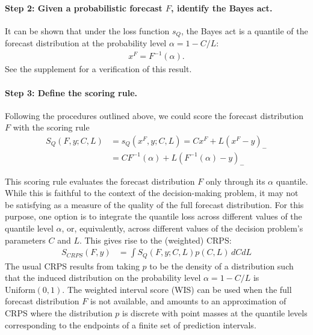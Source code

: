 \documentclass{article}
\begin{document}
\paragraph{Step 2: Given a probabilistic forecast $F$, identify the Bayes act.} It can be shown that under the loss function $s_Q$, the Bayes act is a quantile of the forecast distribution at the probability level $\alpha = 1 - C/L$:
\begin{align}
x^F = F^{-1}(\alpha).
\end{align}
See the supplement for a verification of this result.

\paragraph{Step 3: Define the scoring rule.} Following the procedures outlined above, we could score the forecast distribution $F$ with the scoring rule
\begin{align}
S_Q(F, y; C, L) &= s_Q(x^F, y; C, L) = Cx^F + L(x^F-y)_- \\
&= C F^{-1}(\alpha) + L \left(F^{-1}(\alpha) - y\right)_-
\end{align}

This scoring rule evaluates the forecast distribution $F$ only through its $\alpha$ quantile. While this is faithful to the context of the decision-making problem, it may not be satisfying as a measure of the quality of the full forecast distribution. For this purpose, one option is to integrate the quantile loss across different values of the quantile level $\alpha$, or, equivalently, across different values of the decision problem's parameters $C$ and $L$. This gives rise to the (weighted) CRPS:
\begin{align*}
    S_{CRPS}(F, y) &= \int S_Q(F, y; C, L) p(C, L) \, dC dL
\end{align*}
The usual CRPS results from taking $p$ to be the density of a distribution such that the induced distribution on the probability level $\alpha = 1 - C/L$ is $\text{Uniform}(0,1)$.
The weighted interval score (WIS) can be used when the full forecast distribution $F$ is not available, and amounts to an approximation of CRPS where the distribution $p$ is discrete with point masses at the quantile levels corresponding to the endpoints of a finite set of prediction intervals.
\end{document}

